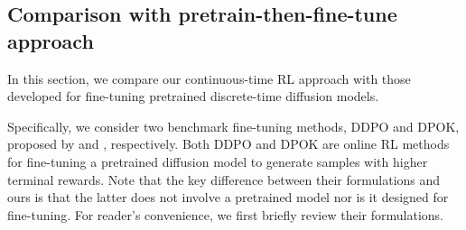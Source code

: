 \documentclass[11pt]{article}
\begin{document}
\subsection{Comparison with pretrain-then-fine-tune approach}\label{sec:finetue}

In this section, we compare our continuous-time RL approach with those developed for fine-tuning pretrained discrete-time diffusion models.

Specifically, we consider two benchmark fine-tuning methods, DDPO and DPOK, proposed by \cite{black2023training} and \cite{fan2024reinforcement}, respectively. Both DDPO and DPOK are online RL methods for fine-tuning a pretrained diffusion model to generate samples with higher terminal rewards. Note that the key difference between their formulations and ours is that the latter does not involve a pretrained model nor is it designed for fine-tuning.
For reader's convenience, we first briefly review their formulations. %
\end{document}
